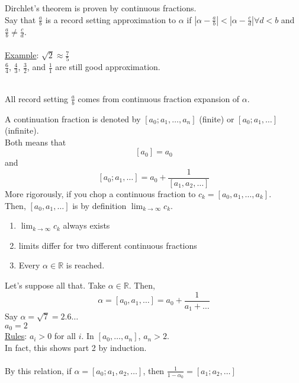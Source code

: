     \noindent Dirchlet's theorem is proven by continuous fractions.\\
    Say that $\frac{a}{b}$ is a record setting approximation to $\alpha$
    if $|\alpha - \frac{a}{b}| < |\alpha - \frac{c}{d}| \forall d < b$ and
    $\frac{a}{b} \not= \frac{c}{d}$.\\\\
    \underline{Example}: $\sqrt{2} \approx \frac{7}{5}$\\
    $\frac{6}{4}$, $\frac{4}{3}$, $\frac{3}{2}$, and $\frac{1}{1}$ are
    still good approximation.\\\\
    \begin{theorem}
      All record setting $\frac{a}{b}$ comes from continuous fraction expansion
      of $\alpha$.
    \end{theorem}
    A continuation fraction is denoted by $[a_{0}; a_1, \ldots, a_n]$ (finite) 
    or $[a_0; a_1, \ldots]$ (infinite).\\
    Both means that 
    $$
      [a_0] = a_0
    $$
    and 
    $$
      [a_0; a_1, \ldots] = a_0 + \frac{1}{[a_1, a_2, \ldots]}
    $$
    More rigorously, if you chop a continuous fraction to $c_k = [a_0, 
    a_1, \ldots, a_k]$.\\
    Then, $[a_0, a_1, \ldots]$ is by definition $\lim_{k \to \infty} c_k$.\\
    \begin{theorem}
      \begin{enumerate}
        \item $\lim_{k \to \infty} c_k$ always exists
        \item limits differ for two different continuous fractions
        \item Every $\alpha \in \mathbb{R}$ is reached.
      \end{enumerate}
    \end{theorem}
    Let's suppose all that.
    Take $\alpha \in \mathbb{R}$. Then,
    $$
      \alpha = [a_0, a_1, \ldots] = a_0 + \frac{1}{a_1 + \ldots}
    $$
    Say $\alpha = \sqrt{7} = 2.6\ldots$\\
    $a_0 = 2$\\
    \underline{Rules}: $a_i > 0$ for all $i$. In $[a_0, \ldots, a_n]$, $a_n
    >2$.\\
    In fact, this shows part 2 by induction.\\\\
    By this relation, if $\alpha = [a_0; a_1, a_2, \ldots]$, then
    $\frac{1}{1 - \alpha_0} = [a_1; a_2, \ldots]$\\
